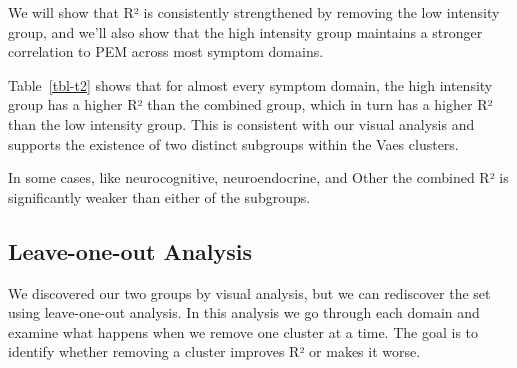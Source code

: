 \documentclass[
  letterpaper,
  DIV=11,
  numbers=noendperiod]{scrartcl}
\begin{document}
We will show that R² is consistently strengthened by removing the low
intensity group, and we'll also show that the high intensity group
maintains a stronger correlation to PEM across most symptom domains.
\FloatBarrier

\begin{table}

\caption{\label{tbl-t2}R² by Domain}


\end{table}%

Table~\ref{tbl-t2} shows that for almost every symptom domain, the high
intensity group has a higher R² than the combined group, which in turn
has a higher R² than the low intensity group. This is consistent with
our visual analysis and supports the existence of two distinct subgroups
within the Vaes clusters.

In some cases, like neurocognitive, neuroendocrine, and Other the
combined R² is significantly weaker than either of the subgroups.

\FloatBarrier

\subsection{Leave-one-out Analysis}\label{leave-one-out-analysis}

We discovered our two groups by visual analysis, but we can rediscover
the set using leave-one-out analysis. In this analysis we go through
each domain and examine what happens when we remove one cluster at a
time. The goal is to identify whether removing a cluster improves R² or
makes it worse.
\end{document}
